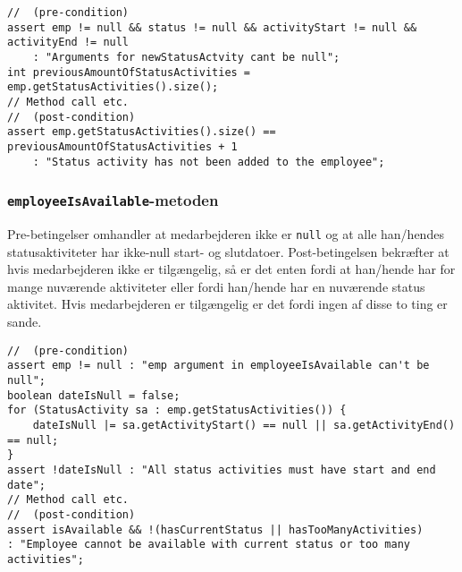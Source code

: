 \begin{lstlisting}
//  (pre-condition)
assert emp != null && status != null && activityStart != null && activityEnd != null 
    : "Arguments for newStatusActvity cant be null";  
int previousAmountOfStatusActivities = emp.getStatusActivities().size();
// Method call etc.
//  (post-condition)
assert emp.getStatusActivities().size() == previousAmountOfStatusActivities + 1 
    : "Status activity has not been added to the employee";
\end{lstlisting}


\subsubsection{\texttt{employeeIsAvailable}-metoden}
Pre-betingelser omhandler at medarbejderen ikke er \texttt{null} og at alle han/hendes statusaktiviteter har ikke-null start- og slutdatoer. Post-betingelsen bekræfter at hvis medarbejderen ikke er tilgængelig, så er det enten fordi at han/hende har for mange nuværende aktiviteter eller fordi han/hende har en nuværende status aktivitet. Hvis medarbejderen er tilgængelig er det fordi ingen af disse to ting er sande. 
\begin{lstlisting}
//  (pre-condition)
assert emp != null : "emp argument in employeeIsAvailable can't be null";
boolean dateIsNull = false;
for (StatusActivity sa : emp.getStatusActivities()) {
    dateIsNull |= sa.getActivityStart() == null || sa.getActivityEnd() == null;
}
assert !dateIsNull : "All status activities must have start and end date";
// Method call etc.
//  (post-condition)
assert isAvailable && !(hasCurrentStatus || hasTooManyActivities) 
: "Employee cannot be available with current status or too many activities";
\end{lstlisting}

